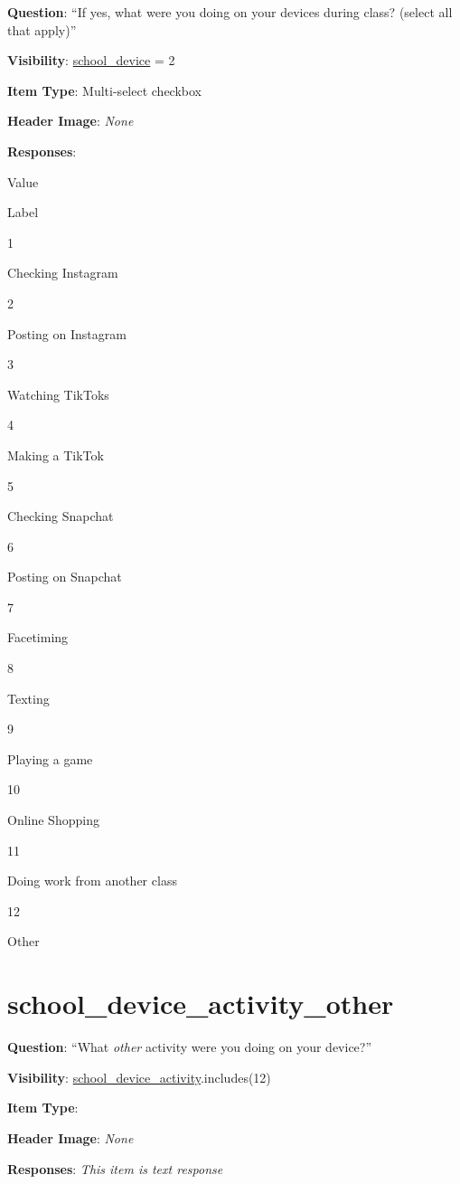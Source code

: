 \documentclass[]{book}
\begin{document}
\textbf{Question}: ``If yes, what were you doing on your devices during class? (select all that apply)''

\textbf{Visibility}: \protect\hyperlink{school_device}{school\_device} = 2

\textbf{Item Type}: Multi-select checkbox

\textbf{Header Image}: \emph{None}

\textbf{Responses}:

Value

Label

1

Checking Instagram

2

Posting on Instagram

3

Watching TikToks

4

Making a TikTok

5

Checking Snapchat

6

Posting on Snapchat

7

Facetiming

8

Texting

9

Playing a game

10

Online Shopping

11

Doing work from another class

12

Other

\hypertarget{school_device_activity_other}{%
\section{school\_device\_activity\_other}\label{school_device_activity_other}}

\textbf{Question}: ``What \emph{other} activity were you doing on your device?''

\textbf{Visibility}: \protect\hyperlink{school_device_activity}{school\_device\_activity}.includes(12)

\textbf{Item Type}:

\textbf{Header Image}: \emph{None}

\textbf{Responses}: \emph{This item is text response}
\end{document}
